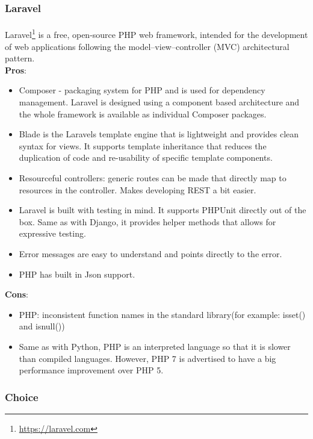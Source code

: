 \documentclass{l4proj}
\begin{document}
\subsubsection{Laravel}
\paragraph{}
Laravel\footnote{\url{https://laravel.com}} is a free, open-source PHP web framework, intended for the development of web applications following the model–view–controller (MVC) architectural pattern.
\\ \textbf{Pros}:
\begin{itemize}
	\item Composer - packaging system for PHP and is used for dependency management. Laravel is designed using a component based architecture and the whole framework is available as individual Composer packages. 
	\item Blade is the Laravel\textquotesingle s template engine that is lightweight and provides clean syntax for views. It supports template inheritance that reduces the duplication of code and re-usability of specific template components. 
	\item Resourceful controllers: generic routes can be made that directly map to resources in the controller. Makes developing REST a bit easier.
	\item Laravel is built with testing in mind. It supports PHPUnit directly out of the box. Same as with Django, it provides helper methods that allows for expressive testing.  
	\item Error messages are easy to understand and points directly to the error.
	\item PHP has built in Json support.
\end{itemize}
\textbf{Cons}:
\begin{itemize}
	\item PHP: inconsistent function names in the standard library(for example: isset() and isnull())
	\item Same as with Python, PHP is an interpreted language so that it is slower than compiled languages. However, PHP 7 is advertised to have a big performance improvement over PHP 5.
\end{itemize}

\subsubsection{Choice}
\end{document}
